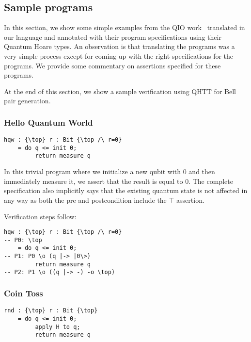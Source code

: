 \documentclass[acmsmall,nonacm,timestamp,review=false,anonymous=false]{acmart}
\begin{document}
\subsection{Sample programs}
\label{sec:examples}

In this section, we show some simple examples from the QIO work~\cite{qio} translated in our language and annotated with their program specifications using their Quantum Hoare types. An observation is that translating the programs was a very simple process except for coming up with the right specifications for the programs. We provide some commentary on assertions specified for these programs.

At the end of this section, we show a sample verification using QHTT for Bell pair generation.

\subsubsection{Hello Quantum World}
\leavevmode

\begin{minipage}{0.95\linewidth}
\begin{lstlisting}[language=QHaskell]
hqw : {\top} r : Bit {\top /\ r=0}
    = do q <= init 0;
         return measure q
\end{lstlisting}
\end{minipage}

In this trivial program where we initialize a new qubit with 0 and then immediately measure it, we assert that the result is equal to 0. The complete specification also implicitly says that the existing quantum state is not affected in any way as both the pre and postcondition include the $\top$ assertion.

Verification steps follow:

\begin{minipage}{0.95\linewidth}
\begin{lstlisting}[language=QHaskell]
hqw : {\top} r : Bit {\top /\ r=0}
-- P0: \top
    = do q <= init 0;
-- P1: P0 \o (q |-> |0\>)
         return measure q
-- P2: P1 \o ((q |-> -) -o \top)
\end{lstlisting}
\end{minipage}

\subsubsection{Coin Toss}
\leavevmode

\begin{minipage}{0.95\linewidth}
\begin{lstlisting}[language=QHaskell]
rnd : {\top} r : Bit {\top}
    = do q <= init 0;
         apply H to q;
         return measure q
\end{lstlisting}
\end{minipage}
\end{document}
